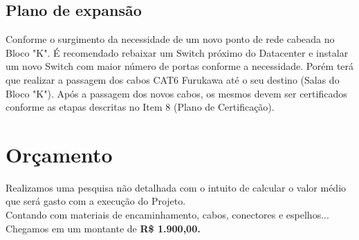 \documentclass[	DIV=calc,%
paper=a4,%
fontsize=12pt,%
onecolumn]{scrartcl}	 					%
\begin{document}
	
	\subsection{Plano de expansão}
	
	Conforme o surgimento da necessidade de um novo ponto de rede cabeada no Bloco "K". É recomendado  rebaixar um Switch próximo do Datacenter e instalar um novo Switch com maior número de portas conforme a necessidade. Porém terá que realizar a passagem dos cabos CAT6 Furukawa até o seu destino (Salas do Bloco "K"). Após a passagem dos novos cabos, os mesmos devem ser certificados conforme as etapas descritas no Item 8 (Plano de Certificação).
	
	\section{Orçamento}
	Realizamos uma pesquisa não detalhada com o intuito de calcular o valor médio que será gasto com a execução do Projeto.
	\\
	Contando com materiais de encaminhamento, cabos, conectores e espelhos...
	\\
	Chegamos em um montante de \textbf{R\$ 1.900,00.} 
	
\end{document}
